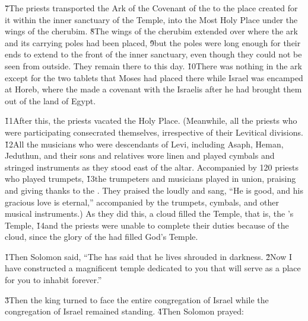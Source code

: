\v{7}The priests transported the Ark of the Covenant of the  to the place created for it within the inner sanctuary of the Temple, into the Most Holy Place under the wings of the cherubim. \v{8}The wings of the cherubim extended over where the ark and its carrying poles had been placed, \v{9}but the poles were long enough for their ends to extend to the front of the inner sanctuary, even though they could not be seen from outside. They remain there to this day. \v{10}There was nothing in the ark except for the two tablets that Moses had placed there while Israel was encamped at Horeb, where the  made a covenant with the Israelis after he had brought them out of the land of Egypt.

\v{11}After this, the priests vacated the Holy Place. (Meanwhile, all the priests who were participating consecrated themselves, irrespective of their Levitical divisions. \v{12}All the musicians who were descendants of Levi, including Asaph, Heman, Jeduthun, and their sons and relatives wore linen and played cymbals and stringed instruments as they stood east of the altar. Accompanied by 120 priests who played trumpets, \v{13}the trumpeters and musicians played in union, praising and giving thanks to the . They praised the  loudly and sang, ``He is good, and his gracious love is eternal,'' accompanied by the trumpets, cymbals, and other musical instruments.) As they did this, a cloud filled the Temple, that is, the 's Temple, \v{14}and the priests were unable to complete their duties because of the cloud, since the glory of the  had filled God's Temple.

\v{1}Then Solomon said, ``The  has said that he lives shrouded in darkness. \v{2}Now I have constructed a magnificent temple dedicated to you that will serve as a place for you to inhabit forever.''

\v{3}Then the king turned to face the entire congregation of Israel while the congregation of Israel remained standing. \v{4}Then Solomon prayed:

